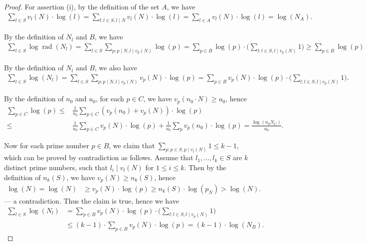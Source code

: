 \documentclass[10pt,a4paper]{amsart}
\DeclareMathOperator{\rad}{\text{rad}}
\begin{document}
\begin{proof}
For assertion (i), by the definition of the set $A$, we have 
\small\begin{align*}
    \sum_{l\in S}v_l(N)\cdot\log(l) = \sum_{l:l\in S,l\mid N}v_l(N)\cdot\log(l) = \sum_{l\in A}v_l(N)\cdot\log(l) = \log(N_A).
\end{align*}\normalsize


By the definition of $N_l$ and $B$, we have 
\small\begin{align*}
\sum_{l\in S} \log\rad(N_l)
= \sum_{l \in S} \sum_{p: p\mid N, l\mid v_p(N)} \log(p)
= \sum_{p\in B}\log(p)\cdot\big(\sum_{l:l \in S,l\mid v_p(N)} 1 \big)
\ge \sum_{p\in B} \log(p) 
\end{align*}\normalsize


By the definition of $N_l$ and $B$, we also have 
\small\begin{align*}
\sum_{l\in S} \log(N_l)
= \sum_{l \in S} \sum_{p:p\mid N,l\mid v_p(N)} v_p(N)\cdot \log(p)
= \sum_{p\in B}v_p(N)\cdot \log(p)\cdot\big(\sum_{l:l \in S,l\mid v_p(N)} 1 \big).
\end{align*}\normalsize


By the definition of $n_0$ and $u_0$, for each $p\in C$, we have $v_p(n_0 \cdot N) \ge u_0$, hence 
\small\begin{align*}
\sum_{p\in C} \log(p) \le&  \frac{1}{u_0} \sum_{p\in C} (v_p(n_0) + v_p(N) ) \cdot \log(p) 
\\ \le&  \frac{1}{u_0} \sum_{p\in C} v_p(N)\cdot \log(p) 
+ \frac{1}{u_0} \sum_{p} v_p(n_0) \cdot \log(p)   
= \frac{\log(n_0 N_C)}{u_0}.
\end{align*}\normalsize


Now for each prime number $p\in B$, we claim that $\sum_{p:p\in S, p\mid v_l(N)} 1 \le k-1$, which can be proved by contradiction as follows.
Assume that $l_1,\dots, l_k\in S$ are $k$ distinct prime numbers, such that $l_i\mid v_l(N)$ for $1\le i\le k$. Then by the definition of $n_k(S)$, we have $v_p(N) \ge n_k(S)$, hence
\begin{align*}
    \log(N) = \log(N) &\ge v_p(N)\cdot \log(p)\ge n_k(S) \cdot \log(p_N)  > \log(N).
\end{align*}
--- a contradiction. Thus the claim is true, hence we have 
\small\begin{align*}
    \sum_{l\in S} \log(N_l)
    &= \sum_{p\in B} v_p(N)\cdot \log(p)\cdot\big(\sum_{l: l \in S, l\mid v_p(N)} 1 \big)
   \\&\le (k-1)\cdot\sum_{p\in B}v_p(N)\cdot \log(p) = (k-1)\cdot\log(N_B).
\end{align*}\normalsize


\end{proof}
\end{document}

